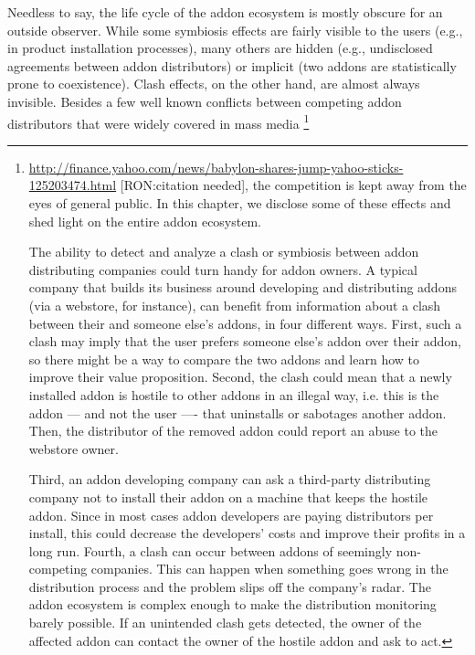 \documentclass[11pt,oneside]{book}
\begin{document}
Needless to say, the life cycle of the addon ecosystem is mostly obscure for an outside observer. While some symbiosis effects are fairly visible to the users (e.g., in product installation processes), many others are hidden (e.g., undisclosed agreements between addon distributors) or implicit (two addons are statistically prone to coexistence). Clash effects, on the other hand, are almost always invisible. Besides a few well known conflicts between competing addon distributors that were widely covered in mass media \footnote{\url{http://finance.yahoo.com/news/babylon-shares-jump-yahoo-sticks-125203474.html} [RON:citation needed], the competition is kept away from the eyes of general public. In this chapter, we disclose some of these effects and shed light on the entire addon ecosystem. 

The ability to detect and analyze a clash or symbiosis between addon distributing companies could turn handy for addon owners. 
A typical company that builds its business around developing and distributing addons (via a webstore, for instance), can benefit from information about a clash between their and someone else's addons, in four different ways.
First, such a clash may imply that the user prefers someone else's addon over their addon, so there might be a way to compare the two addons and  learn how to improve their value proposition. 
Second, the clash could mean that a newly installed addon is hostile to other addons in an illegal way, i.e. this is the addon --- and not the user ---- that uninstalls or sabotages another addon. Then, the distributor of the removed addon could report an abuse to the webstore owner.

Third, an addon developing company can ask a third-party distributing company not to install their addon on a machine that keeps the hostile addon. Since in most cases addon developers are paying distributors per install, this could decrease the developers' costs and improve their profits in a long run.
Fourth, a clash can occur between addons of seemingly non-competing companies. This can happen when something goes wrong in the distribution process and the problem slips off the company's radar. The addon ecosystem is complex enough to make the distribution monitoring barely possible. If an unintended clash gets detected, the owner of the affected addon can contact the owner of the hostile addon and ask to act.

}
\end{document}
